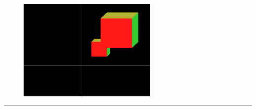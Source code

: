 \documentclass[9pt,letterpaper]{article}
\begin{document}
\begin{figure}[h]
    \centering
    \includegraphics[height=5cm]{Outputs/OP5.png}
\end{figure}


\bigskip\bigskip
\hrule
\end{document}
